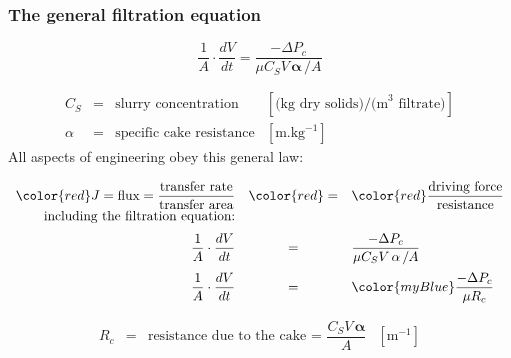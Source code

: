 \begin{frame}\frametitle{The general filtration equation}
	\begin{exampleblock}{}
		\[\dfrac{1}{A} \cdot \dfrac{dV}{dt} = \dfrac{-\Delta P_c}{\mu C_S V  \, \mathbf{ \alpha}\, / A} 
			\]
	\end{exampleblock}
	\[
		\begin{array}{rcll}
			C_S  	&=& \text{slurry concentration}				&[\text{(kg dry solids)/(m}^{3}\text{ filtrate)}]\\
			\alpha	&=& \text{specific cake resistance} 		&[\text{m.kg}^{-1}]
		\end{array}
	\]
	All aspects of engineering obey this general law:
	\begin{exampleblock}{}
		\[
		\begin{array}{rcl}
			{\color{red}J = \text{flux} = \dfrac{\text{transfer rate}}{\text{transfer area}}} &{\color{red}=}& {\color{red}\dfrac{\text{driving force}}{\text{resistance}}}\\
			\vspace{6pt}
			\text{including the filtration equation:}\\
			\vspace{6pt}
			\dfrac{1}{A} \cdot \dfrac{dV}{dt} &=& \dfrac{-\Delta P_c}{\mu  C_S V \, \mathbf{ \alpha}\, / A} \\
			\dfrac{1}{A} \cdot \dfrac{dV}{dt} &=& {\color{myBlue}\dfrac{-\Delta P_c}{\mu R_c}} 
		\end{array}
		\]
	\end{exampleblock}
	\vspace{-14pt}
	\[
		\begin{array}{rcll}
			R_c  &=& \text{resistance due to the cake = $\dfrac{C_S V \, \mathbf{ \alpha}}{A}$}				&[\text{m}^{-1}]\\
		\end{array}
	\]
\end{frame}

